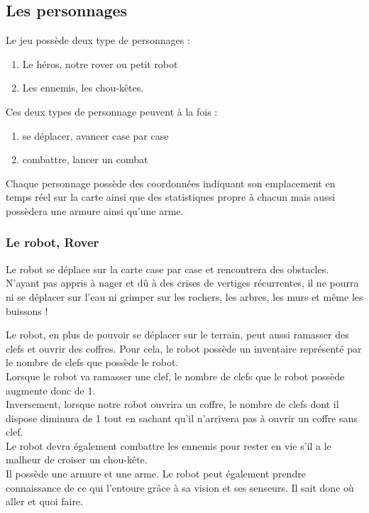 \documentclass[a4paper 12pts]{article}
\begin{document}
\subsection{Les personnages}

\vspace{1cm}


Le jeu possède deux type de personnages : 

\vspace{0.5cm}

\begin{enumerate}
	\item Le héros, notre rover ou petit robot
	\item Les ennemis, les chou-kêtes.
\end{enumerate}

\vspace{0.5cm}

Ces deux types de personnage peuvent à la fois :

\vspace{0.5cm}

\begin{enumerate}
	\item se déplacer, avancer case par case 
	\item combattre, lancer un combat
\end{enumerate}

\vspace{0.5cm}

Chaque personnage possède des coordonnées indiquant son emplacement en temps réel sur la carte ainsi que des statistiques propre à chacun mais aussi possèdera une armure ainsi qu'une arme.

\newpage
\subsubsection{Le robot, Rover}
\vspace{1cm}

Le robot se déplace sur la carte case par case et rencontrera des obstacles.
N'ayant pas appris à nager et dû à des crises de vertiges récurrentes, il ne pourra ni se déplacer sur l'eau ni grimper sur les rochers,
les arbres, les murs et même les buissons !

Le robot, en plus de pouvoir se déplacer sur le terrain, peut aussi ramasser des clefs et ouvrir des coffres.
Pour cela, le robot possède un inventaire représenté par le nombre de clefs que possède le robot.\\
Lorsque le robot va ramasser une clef, le nombre de clefs que le robot possède augmente donc de 1.\\
Inversement, lorsque notre robot ouvrira un coffre, le nombre de clefs dont il dispose diminura de 1 tout en sachant qu'il n'arrivera pas à ouvrir un coffre sans clef.\\
Le robot devra également combattre les ennemis pour rester en vie s'il a le malheur de croiser un chou-kête.\\
Il possède une armure et une arme.
Le robot peut également prendre connaissance de ce qui l'entoure grâce à sa vision et ses senseurs. Il sait donc où aller et quoi faire.
\end{document}
